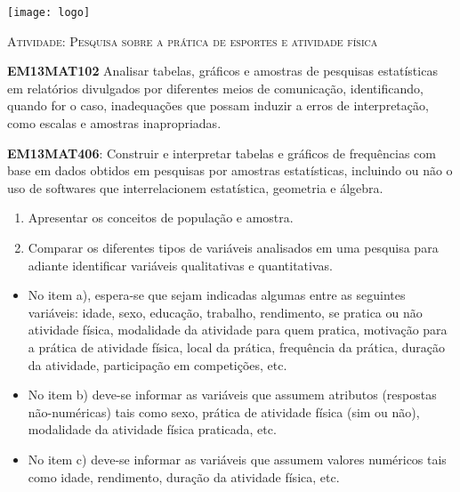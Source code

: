 \documentclass[10 pt,usenames,dvipsnames, oneside]{article}
\begin{document}
\begin{center}
  \begin{minipage}[l]{3cm}
\texttt{[image: logo]}    
\end{minipage}\hfill
\begin{minipage}[r]{.8\textwidth}
 {\Large \scshape Atividade: Pesquisa sobre a prática de esportes e atividade física}  
\end{minipage}
\end{center}
\vspace{.2cm}

\ifdefined\prof
\begin{objetivos}
\item \textbf{EM13MAT102} Analisar tabelas, gráficos e amostras de pesquisas estatísticas em relatórios divulgados por diferentes meios de comunicação, identificando, quando for o caso, inadequações que possam induzir a erros de interpretação, como escalas e amostras inapropriadas.

\item \textbf{EM13MAT406}: Construir e interpretar tabelas e gráficos de frequências com base em dados obtidos em pesquisas por amostras estatísticas, incluindo ou não o uso de softwares que interrelacionem estatística, geometria e álgebra.
\end{objetivos}

\begin{goals}
\begin{enumerate}

\item Apresentar os conceitos de população e amostra.

\item Comparar os diferentes tipos de variáveis analisados em uma pesquisa para adiante identificar variáveis qualitativas e quantitativas.

\end{enumerate}

\tcblower

\begin{itemize}
\item No item a), espera-se que sejam indicadas algumas entre as seguintes variáveis: idade, sexo, educação, trabalho, rendimento, se pratica ou não atividade física, modalidade da atividade para quem pratica, motivação para a prática de atividade física, local da prática, frequência da prática, duração da atividade, participação em competições, etc.

\item No item b) deve-se informar as variáveis que assumem atributos (respostas não-numéricas) tais como sexo, prática de atividade física (sim ou não), modalidade da atividade física praticada, etc.

\item No item c) deve-se informar as variáveis que assumem valores numéricos tais como idade, rendimento, duração da atividade física, etc.
\end{itemize}

\end{goals}
\end{document}
